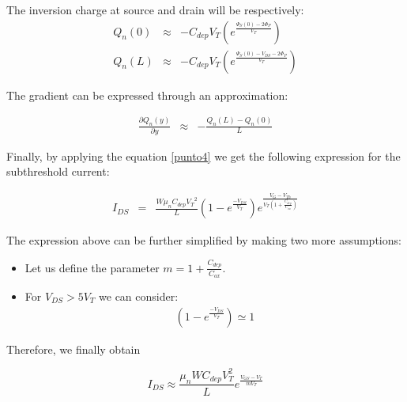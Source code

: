\documentclass[a4paper, 12pt, twoside, openright]{report}
\begin{document}

The inversion charge at source and drain will be respectively:
\begin{eqnarray*}
Q_n(0)&\approx&-C_{dep} V_T
\left(e^{\displaystyle \frac{\Psi_S(0)-2\Phi_P}{V_T}}
\right)\\[2ex]
Q_n(L)&\approx&-C_{dep} V_T
\left(e^{\displaystyle \frac{\Psi_S(0)- {V_{DS}}-2\Phi_P}{V_T}}
\right)
\end{eqnarray*}

The gradient can be expressed through an approximation:

\begin{eqnarray*}
\frac{\partial Q_n(y)}{\partial y} &\approx& - \frac{Q_n(L)-Q_n(0)}{L}
\end{eqnarray*}

Finally, by applying the equation \ref{punto4} we get the following expression for the subthreshold current:

\begin{eqnarray}
I_{DS}&=&\frac{W \mu_n C_{dep} {V_T}^2}{L}
         \left( 1-e^{\displaystyle\frac{-V_{DS}}{V_T}}\right) 
         e^{\displaystyle \frac{ {V_G-V_{Th}}}{V_T\left(1 +\frac{C_{dep}}{C_{ox}}\right)}} 
\end{eqnarray}

The expression above can be further simplified by making two more assumptions:

\begin{itemize}
\item Let us define the parameter $m=1+\frac{C_{dep}}{C_{ox}}$.
\item For $V_{DS}>5V_{T}$ we can consider:
\begin{eqnarray}
\left( 1-e^{\displaystyle\frac{-V_{DS}}{V_T}}\right) \simeq 1
\end{eqnarray}
\end{itemize} 

Therefore, we finally obtain

\begin{equation} \label{final_Ids}
I_{DS} \approx \frac{\mu_n W C_{dep} V_T^2}{L} e^{\frac{V_{GS} - V_T}{m V_T}}
\end{equation}
\end{document}
